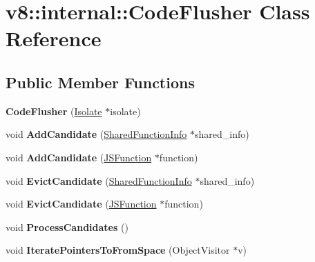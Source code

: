 \hypertarget{classv8_1_1internal_1_1_code_flusher}{}\section{v8\+:\+:internal\+:\+:Code\+Flusher Class Reference}
\label{classv8_1_1internal_1_1_code_flusher}
\subsection*{Public Member Functions}
\begin{DoxyCompactItemize}
\item 
{\bfseries Code\+Flusher} (\hyperlink{classv8_1_1internal_1_1_isolate}{Isolate} $\ast$isolate)\hypertarget{classv8_1_1internal_1_1_code_flusher_a4c23fac56ef2135fe74a46d3d1684133}{}\label{classv8_1_1internal_1_1_code_flusher_a4c23fac56ef2135fe74a46d3d1684133}

\item 
void {\bfseries Add\+Candidate} (\hyperlink{classv8_1_1internal_1_1_shared_function_info}{Shared\+Function\+Info} $\ast$shared\+\_\+info)\hypertarget{classv8_1_1internal_1_1_code_flusher_acb9215ba76ffbf5d3d44cf302276f380}{}\label{classv8_1_1internal_1_1_code_flusher_acb9215ba76ffbf5d3d44cf302276f380}

\item 
void {\bfseries Add\+Candidate} (\hyperlink{classv8_1_1internal_1_1_j_s_function}{J\+S\+Function} $\ast$function)\hypertarget{classv8_1_1internal_1_1_code_flusher_a5e92654c9eb4080d8285da008ff25798}{}\label{classv8_1_1internal_1_1_code_flusher_a5e92654c9eb4080d8285da008ff25798}

\item 
void {\bfseries Evict\+Candidate} (\hyperlink{classv8_1_1internal_1_1_shared_function_info}{Shared\+Function\+Info} $\ast$shared\+\_\+info)\hypertarget{classv8_1_1internal_1_1_code_flusher_a4dca0fb42295266d030a76cf6afe7d2f}{}\label{classv8_1_1internal_1_1_code_flusher_a4dca0fb42295266d030a76cf6afe7d2f}

\item 
void {\bfseries Evict\+Candidate} (\hyperlink{classv8_1_1internal_1_1_j_s_function}{J\+S\+Function} $\ast$function)\hypertarget{classv8_1_1internal_1_1_code_flusher_adc110f078256a849bf4d4687bb01049a}{}\label{classv8_1_1internal_1_1_code_flusher_adc110f078256a849bf4d4687bb01049a}

\item 
void {\bfseries Process\+Candidates} ()\hypertarget{classv8_1_1internal_1_1_code_flusher_a83763f0a781de0b530a1a18a3f18ca01}{}\label{classv8_1_1internal_1_1_code_flusher_a83763f0a781de0b530a1a18a3f18ca01}

\item 
void {\bfseries Iterate\+Pointers\+To\+From\+Space} (Object\+Visitor $\ast$v)\hypertarget{classv8_1_1internal_1_1_code_flusher_a622d02e8eb5ad8dee64debec2c711149}{}\label{classv8_1_1internal_1_1_code_flusher_a622d02e8eb5ad8dee64debec2c711149}

\end{DoxyCompactItemize}

